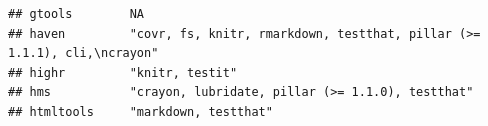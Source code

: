 \documentclass[]{article}
\begin{document}
\begin{verbatim}
## gtools        NA                                                                                                                                                                                                                                                                                                                                                                                                                                                                                                                                                                                        
## haven         "covr, fs, knitr, rmarkdown, testthat, pillar (>= 1.1.1), cli,\ncrayon"                                                                                                                                                                                                                                                                                                                                                                                                                                                                                                                   
## highr         "knitr, testit"                                                                                                                                                                                                                                                                                                                                                                                                                                                                                                                                                                           
## hms           "crayon, lubridate, pillar (>= 1.1.0), testthat"                                                                                                                                                                                                                                                                                                                                                                                                                                                                                                                                          
## htmltools     "markdown, testthat"                                                                                                                                                                                                                                                                                                                                                                                                                                                                                                                                                                      

\end{verbatim}
\end{document}
